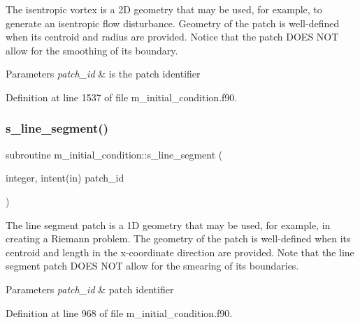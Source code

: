 The isentropic vortex is a 2D geometry that may be used, for example, to generate an isentropic flow disturbance. Geometry of the patch is well-\/defined when its centroid and radius are provided. Notice that the patch D\+O\+ES N\+OT allow for the smoothing of its boundary. 


\begin{DoxyParams}{Parameters}
{\em patch\+\_\+id} & is the patch identifier \\
\hline
\end{DoxyParams}


Definition at line 1537 of file m\+\_\+initial\+\_\+condition.\+f90.

\mbox{\label{namespacem__initial__condition_a3be32c8ee8a7dffae734d063200471e8}} 
\subsubsection{\texorpdfstring{s\+\_\+line\+\_\+segment()}{s\_line\_segment()}}
{\footnotesize\ttfamily subroutine m\+\_\+initial\+\_\+condition\+::s\+\_\+line\+\_\+segment (\begin{DoxyParamCaption}\item[{integer, intent(in)}]{patch\+\_\+id }\end{DoxyParamCaption})}



The line segment patch is a 1D geometry that may be used, for example, in creating a Riemann problem. The geometry of the patch is well-\/defined when its centroid and length in the x-\/coordinate direction are provided. Note that the line segment patch D\+O\+ES N\+OT allow for the smearing of its boundaries. 


\begin{DoxyParams}{Parameters}
{\em patch\+\_\+id} & patch identifier \\
\hline
\end{DoxyParams}


Definition at line 968 of file m\+\_\+initial\+\_\+condition.\+f90.

\mbox{\label{namespacem__initial__condition_afef3f507e182798fcfd7aecc52878fc9}} 
